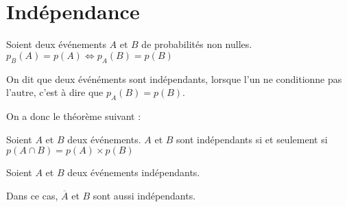 \documentclass[12pt,a4paper,frenchb]{article}
\begin{document}


\pagebreak

\section{Indépendance}

\begin{propriete}
  Soient deux événements $A$ et $B$ de probabilités non nulles.
  $p_B(A) = p(A) \iff p_A(B) = p(B)$
\end{propriete}


On dit que deux événéments sont indépendants, lorsque l'un ne
conditionne pas l'autre, c'est à dire que $p_A(B) = p(B)$.

On a donc le théorème suivant :

\begin{theoreme}[Indépendance]
  Soient $A$ et $B$ deux événements. $A$ et $B$ sont indépendants si et
  seulement si $p(A\cap B) = p(A)\times p(B)$
\end{theoreme}

\begin{propriete}
  Soient $A$ et $B$ deux événements indépendants.

  Dans ce cas, $\overline{A}$ et $B$ sont aussi indépendants.
\end{propriete}

\end{document}
